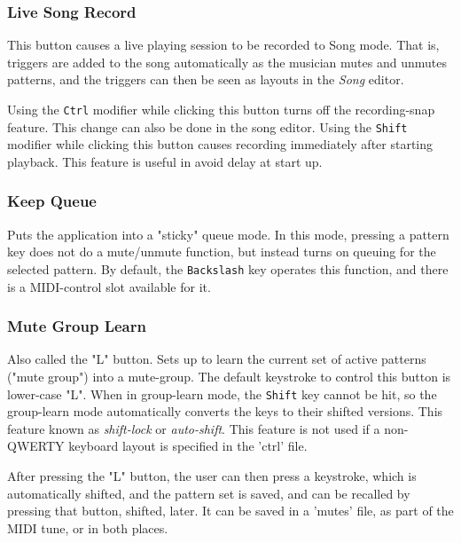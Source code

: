 \subsubsection{Live Song Record}
\label{subsubsec:introduction_live_record_button}

   This button causes a live playing session to be recorded to Song mode.
   That is, triggers are added to the song automatically as the musician mutes
   and unmutes patterns, and the triggers can then be
   seen as layouts in the \textsl{Song} editor.

   Using the \texttt{Ctrl} modifier while clicking this button
   turns off the recording-snap feature.
   This change can also be done in the song editor.
   Using the \texttt{Shift} modifier while clicking this button
   causes recording immediately after starting playback.
   This feature is useful in avoid delay at start up.

\subsubsection{Keep Queue}
\label{subsubsec:introduction_keep_queue_button}

   Puts the application into a "sticky" queue mode.
   In this mode, pressing a pattern key does not do a mute/unmute function, but
   instead turns on queuing for the selected pattern.
   By default, the \texttt{Backslash} key operates this function,
   and there is a MIDI-control slot available for it.

\subsubsection{Mute Group Learn}
\label{subsubsec:introduction_mute_group_learn_button}

   Also called the "L" button.
   Sets up to learn the current set of active patterns ("mute group") into a
   mute-group.
   The default keystroke to control this button is lower-case "L".
   When in group-learn mode, the \texttt{Shift} key cannot be hit, so the
   group-learn mode automatically converts the keys to their shifted versions.
   This feature known as \textsl{shift-lock} or \textsl{auto-shift}.
   This feature is not used if a non-QWERTY keyboard layout is
   specified in the 'ctrl' file.

   After pressing the "L" button, the user can then press a keystroke, which is
   automatically shifted, and the pattern set is saved, and can be recalled by
   pressing that button, shifted, later.
   It can be saved in a 'mutes' file, as part of
   the MIDI tune, or in both places.

